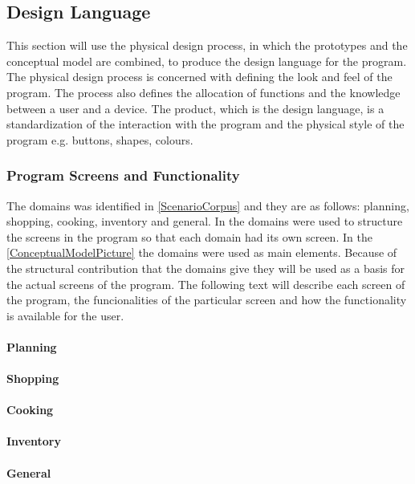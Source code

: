\subsection{Design Language}
This section will use the physical design process, in which the prototypes and the conceptual model are combined, to produce the design language for the program. The physical design process is concerned with defining the look and feel of the program. The process also defines the allocation of functions and the knowledge between a user and a device. The product, which is the design language, is a standardization of the interaction with the program and the physical style of the program e.g. buttons, shapes, colours.

\subsubsection{Program Screens and Functionality}
The domains was identified in \cref{ScenarioCorpus} and they are as follows: planning, shopping, cooking, inventory and general. In  the domains were used to structure the screens in the program so that each domain had its own screen. In the  \cref{ConceptualModelPicture} the domains were used as main elements. Because of the structural contribution that the domains give they will be used as a basis for the actual screens of the program. The following text will describe each screen of the program, the funcionalities of the particular screen and how the functionality is available for the user.

\paragraph{Planning}


\paragraph{Shopping}

\paragraph{Cooking}

\paragraph{Inventory}

\paragraph{General}   
 

   